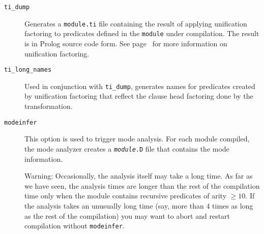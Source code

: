 \begin{description}
\item[{\tt ti\_dump}]
	Generates a {\tt module.ti} file containing the result of applying
	unification factoring to predicates defined in the {\tt module}
	under compilation.  The result is in Prolog source code form.
	See page~\pageref{transformational_indexing} for more information
	on unification factoring.
\item[{\tt ti\_long\_names}]
	Used in conjunction with {\tt ti\_dump}, generates names for
	predicates created by unification factoring that reflect the
	clause head factoring done by the transformation.
\item[{\tt modeinfer}]
	This option is used to trigger mode analysis. For each module
	compiled,  the mode analyzer creates a  {\tt {\em module}.D} file
	that contains the mode information.

	{\sc Warning:}
	Occasionally, the analysis itself may take a long time. 
	As far as we have seen,
	the analysis times are longer than the rest of the compilation time
	only when the module contains recursive predicates of arity $\geq 10$.
	If the analysis takes an unusually long time
	(say, more than 4 times as long as the rest of the compilation)
	you may want to abort and restart compilation without {\tt modeinfer}.
	

\end{description}
